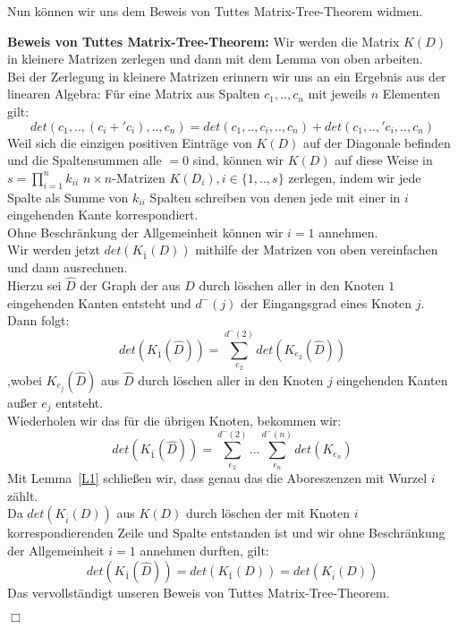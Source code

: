 Nun können wir uns dem Beweis von Tuttes Matrix-Tree-Theorem widmen.

\textbf{Beweis von Tuttes Matrix-Tree-Theorem:}
Wir werden die Matrix $K(D)$ in kleinere Matrizen zerlegen und dann mit dem Lemma von oben arbeiten.\\
Bei der Zerlegung in kleinere Matrizen erinnern wir uns an ein Ergebnis aus der linearen Algebra:
Für eine Matrix aus Spalten $c_1,..,c_n$ mit jeweils $n$ Elementen gilt:
\begin{equation}
 det(c_1,..,(c_i+\prime{c_i}),..,c_n) = det(c_1,..,c_i,..,c_n) + det(c_1,..,\prime{c_i},..,c_n)
\end{equation}
Weil sich die einzigen positiven Einträge von $K(D)$ auf der Diagonale befinden und die Spaltensummen alle $=0$ sind, können wir $K(D)$ auf diese Weise in  $s=\prod_{i=1}^nk_{ii}$ $n \times n$-Matrizen $K(D_i), i\in\{1,..,s\}$ zerlegen, indem wir jede Spalte als Summe von $k_{ii}$ Spalten schreiben von denen jede mit einer in $i$ eingehenden Kante korrespondiert.\\
Ohne Beschränkung der Allgemeinheit können wir $i=1$ annehmen.\\
Wir werden jetzt $det(K_{\bar{1}}(D))$ mithilfe der Matrizen von oben vereinfachen und dann ausrechnen.\\
Hierzu sei $\hat{D}$ der Graph der aus $D$ durch löschen aller in den Knoten $1$ eingehenden Kanten entsteht und $d^{-}(j)$ der Eingangsgrad eines Knoten $j$. Dann folgt:
\begin{equation}
 det(K_{\bar{1}}(\hat{D})) = \sum_{e_2}^{d^{-}(2)}det(K_{e_2}(\hat{D}))
\end{equation}
,wobei $K_{e_j}(\hat{D})$ aus $\hat{D}$ durch löschen aller in den Knoten $j$ eingehenden Kanten außer $e_j$ entsteht.\\
Wiederholen wir das für die übrigen Knoten, bekommen wir:
\begin{equation}
  det(K_{\bar{1}}(\hat{D})) = \sum_{e_2}^{d^{-}(2)}...\sum_{e_n}^{d^{-}(n)}det(K_{e_n})
\end{equation}
Mit Lemma~\ref{L1} schließen wir, dass genau das die Aboreszenzen mit Wurzel $i$ zählt.\\
Da $det(K_{\bar{i}}(D))$ aus $K(D)$ durch löschen der mit Knoten $i$ korrespondierenden Zeile und Spalte entstanden ist und wir ohne Beschränkung der Allgemeinheit $i=1$ annehmen durften, gilt:
\begin{equation}
 det(K_{\bar{1}}(\hat{D}))=det(K_{\bar{1}}(D))=det(K_{\bar{i}}(D))
\end{equation}
Das vervollständigt unseren Beweis von Tuttes Matrix-Tree-Theorem.
\begin{flushright} $\Box$ \end{flushright} 

